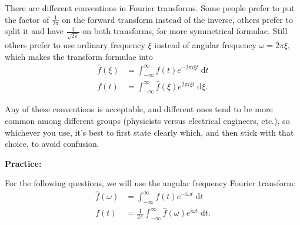 \documentclass{article}
\newcommand{\diff}{\;\mathrm{d}}
\begin{document}
There are different conventions in Fourier transforms. Some people prefer to put the factor of $\frac{1}{2\pi}$ on the forward transform instead of the inverse, others prefer to split it and have $\frac{1}{\sqrt{2\pi}}$ on both transforms, for more symmetrical formulae. Still others prefer to use ordinary frequency $\xi$ instead of angular frequency $\omega=2\pi\xi$, which makes the transform formulae into
\begin{align*}
	\hat{f}(\xi)&=\int_{-\infty}^\infty f(t)e^{-2\pi i\xi t}\diff t\\
	f(t)&=\int_{-\infty}^\infty \hat{f}(\xi)e^{2\pi i\xi t}\diff \xi.
\end{align*}

Any of these conventions is acceptable, and different ones tend to be more common among different groups (physicists versus electrical engineers, etc.), so whichever you use, it's best to first state clearly which, and then stick with that choice, to avoid confusion.


\clearpage










\textbf{Practice:}\bigskip

For the following questions, we will use the angular frequency Fourier transform:
\begin{align*}
	\hat{f}(\omega)&=\int_{-\infty}^\infty f(t)e^{-i\omega t}\diff t\\
	f(t)&=\frac{1}{2\pi}\int_{-\infty}^\infty \hat{f}(\omega)e^{i\omega t}\diff t.
\end{align*}
\end{document}
